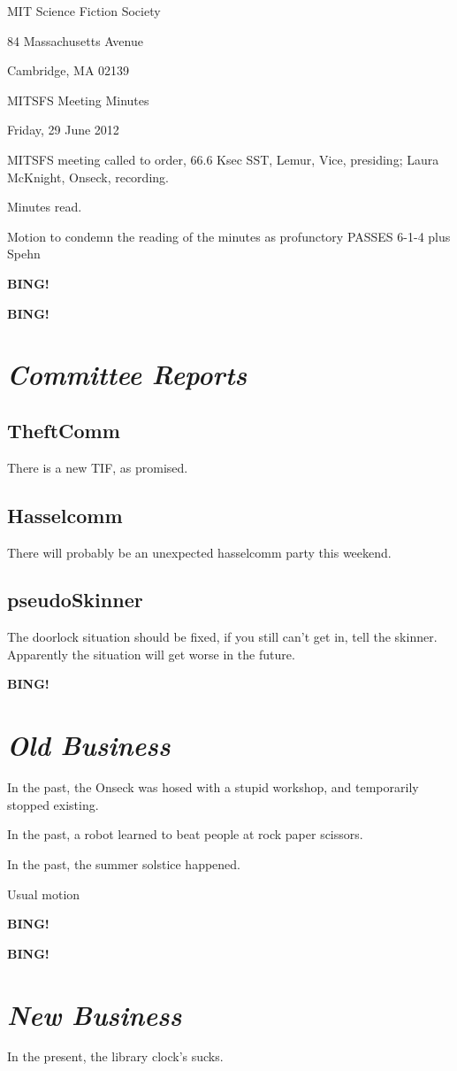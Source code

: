 \documentclass[10pt]{article}
\newcommand{\bing}{{\bf BING!} }
\newcommand{\goto}[1]{\bing \vskip 12pt \section*{{\em{#1}}}}
\newcommand{\ps}{ plus Spehn\xspace}
\newcommand{\onseck}{Laura McKnight, Onseck}
\newcommand{\meetingdate}{Friday, 29 June 2012}
\begin{document}
\begin{center}

MIT Science Fiction Society

84 Massachusetts Avenue

Cambridge, MA 02139

\vspace{12pt}

MITSFS Meeting Minutes

\meetingdate

\end{center}

\vspace{18pt}

\setlength{\parskip}{6pt}

\noindent
MITSFS meeting called to order, 66.6 Ksec SST,
Lemur, Vice, presiding; \onseck, recording.

Minutes read.

Motion to condemn the reading of the minutes as profunctory PASSES 6-1-4\ps

\bing

\goto{Committee Reports}
\subsection*{TheftComm}
There is a new TIF, as promised.

\subsection*{Hasselcomm}
There will probably be an unexpected hasselcomm party this weekend.

\subsection*{pseudoSkinner}
The doorlock situation should be fixed, if you still can't get in, tell the skinner. Apparently the situation will get worse in the future.

\goto{Old Business}
In the past, the Onseck was hosed with a stupid workshop, and temporarily stopped existing.

In the past, a robot learned to beat people at rock paper scissors.

In the past, the summer solstice happened. 

Usual motion

\bing

\goto{New Business}

In the present, the library clock's sucks.
\end{document}
